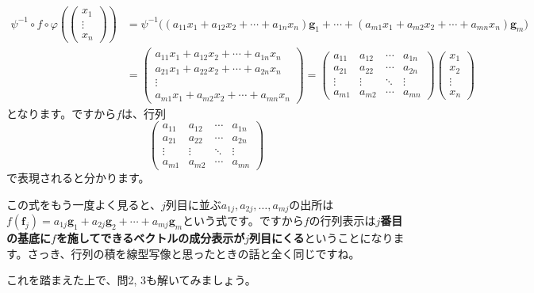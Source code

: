\begin{align*}
\psi^{-1} \circ f\circ \varphi
\left(
\begin{pmatrix}
x_1 \\
\vdots \\
x_n
\end{pmatrix}
\right)
&=\psi^{-1}\bigl((a_{11} x_1 + a_{12} x_2 + \cdots + a_{1n} x_n)\bm{g}_1 + \cdots + (a_{m1} x_1 + a_{m2} x_2 + \cdots + a_{mn} x_n)\bm{g}_m \bigr) \\
&= 
\begin{pmatrix}
a_{11} x_1 + a_{12} x_2 + \cdots + a_{1n} x_n \\
a_{21} x_1 + a_{22} x_2 + \cdots + a_{2n} x_n \\
\vdots \\
a_{m1} x_1 + a_{m2} x_2 + \cdots + a_{mn} x_n
\end{pmatrix}
=
\begin{pmatrix}
a_{11} & a_{12} & \cdots & a_{1n} \\
a_{21} & a_{22} & \cdots & a_{2n} \\
\vdots & \vdots & \ddots & \vdots \\
a_{m1} & a_{m2} & \cdots & a_{mn}
\end{pmatrix}
\begin{pmatrix}
x_1 \\
x_2 \\
\vdots \\
x_n
\end{pmatrix}
\end{align*}
となります。ですから$f$は、行列
\[
\begin{pmatrix}
a_{11} & a_{12} & \cdots & a_{1n} \\
a_{21} & a_{22} & \cdots & a_{2n} \\
\vdots & \vdots & \ddots & \vdots \\
a_{m1} & a_{m2} & \cdots & a_{mn}
\end{pmatrix}
\]
で表現されると分かります。

この式をもう一度よく見ると、$j$列目に並ぶ$a_{1j}, a_{2j}, \ldots, a_{mj}$の出所は$f(\bm{f}_j) = a_{1j} \bm{g}_1 + a_{2j} \bm{g}_2 + \cdots + a_{mj} \bm{g}_m$という式です。ですから$f$の行列表示は\textbf{$j$番目の基底に$f$を施してできるベクトルの成分表示が$j$列目にくる}ということになります。さっき、行列の積を線型写像と思ったときの話と全く同じですね。

これを踏まえた上で、問2, 3も解いてみましょう。


